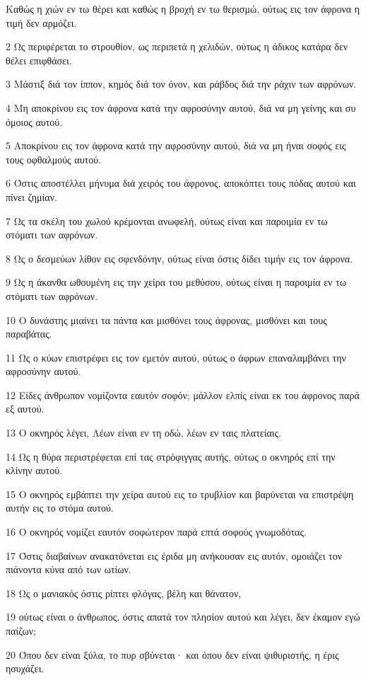 \par Καθώς η χιών εν τω θέρει και καθώς η βροχή εν τω θερισμώ, ούτως εις τον άφρονα η τιμή δεν αρμόζει.
\par 2 Ως περιφέρεται το στρουθίον, ως περιπετά η χελιδών, ούτως η άδικος κατάρα δεν θέλει επιφθάσει.
\par 3 Μάστιξ διά τον ίππον, κημός διά τον όνον, και ράβδος διά την ράχιν των αφρόνων.
\par 4 Μη αποκρίνου εις τον άφρονα κατά την αφροσύνην αυτού, διά να μη γείνης και συ όμοιος αυτού.
\par 5 Αποκρίνου εις τον άφρονα κατά την αφροσύνην αυτού, διά να μη ήναι σοφός εις τους οφθαλμούς αυτού.
\par 6 Όστις αποστέλλει μήνυμα διά χειρός του άφρονος, αποκόπτει τους πόδας αυτού και πίνει ζημίαν.
\par 7 Ως τα σκέλη του χωλού κρέμονται ανωφελή, ούτως είναι και παροιμία εν τω στόματι των αφρόνων.
\par 8 Ως ο δεσμεύων λίθον εις σφενδόνην, ούτως είναι όστις δίδει τιμήν εις τον άφρονα.
\par 9 Ως η άκανθα ωθουμένη εις την χείρα του μεθύσου, ούτως είναι η παροιμία εν τω στόματι των αφρόνων.
\par 10 Ο δυνάστης μιαίνει τα πάντα και μισθόνει τους άφρονας, μισθόνει και τους παραβάτας.
\par 11 Ως ο κύων επιστρέφει εις τον εμετόν αυτού, ούτως ο άφρων επαναλαμβάνει την αφροσύνην αυτού.
\par 12 Είδες άνθρωπον νομίζοντα εαυτόν σοφόν; μάλλον ελπίς είναι εκ του άφρονος παρά εξ αυτού.
\par 13 Ο οκνηρός λέγει, Λέων είναι εν τη οδώ, λέων εν ταις πλατείαις.
\par 14 Ως η θύρα περιστρέφεται επί τας στρόφιγγας αυτής, ούτως ο οκνηρός επί την κλίνην αυτού.
\par 15 Ο οκνηρός εμβάπτει την χείρα αυτού εις το τρυβλίον και βαρύνεται να επιστρέψη αυτήν εις το στόμα αυτού.
\par 16 Ο οκνηρός νομίζει εαυτόν σοφώτερον παρά επτά σοφούς γνωμοδότας.
\par 17 Όστις διαβαίνων ανακατόνεται εις έριδα μη ανήκουσαν εις αυτόν, ομοιάζει τον πιάνοντα κύνα από των ωτίων.
\par 18 Ως ο μανιακός όστις ρίπτει φλόγας, βέλη και θάνατον,
\par 19 ούτως είναι ο άνθρωπος, όστις απατά τον πλησίον αυτού και λέγει, δεν έκαμον εγώ παίζων;
\par 20 Όπου δεν είναι ξύλα, το πυρ σβύνεται· και όπου δεν είναι ψιθυριστής, η έρις ησυχάζει.

